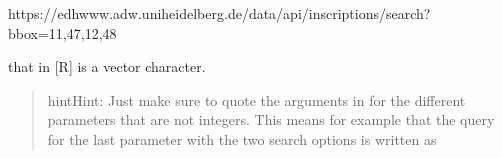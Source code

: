 \documentclass[a4paper,12pt,english]{sphinxhowto}
\begin{document}
\begin{sphinxVerbatim}[commandchars=\\\{\},formatcom=\footnotesize]
https://edh\PYGZhy{}www.adw.uni\PYGZhy{}heidelberg.de/data/api/inscriptions/search?bbox=11,47,12,48
\end{sphinxVerbatim}

that in {[}R{]} is a vector character.
\begin{quote}

\begin{sphinxadmonition}{hint}{Hint:}
Just make sure to quote the arguments in  for the different
parameters that are not integers. This means for example that the query
for the last parameter with the two search options is written as

\begin{sphinxVerbatim}[commandchars=\\\{\},formatcom=\footnotesize]
  
  
\end{sphinxVerbatim}
\end{sphinxadmonition}
\end{quote}
\end{document}
